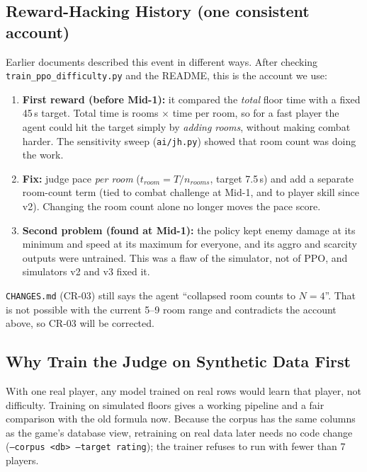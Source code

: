 \subsection{Reward-Hacking History (one consistent account)}
\label{sec:reward_history}
Earlier documents described this event in different ways. After checking \texttt{train\_ppo\_difficulty.py} and the README, this is the account we use:
\begin{enumerate}
    \item \textbf{First reward (before Mid-1):} it compared the \emph{total} floor time with a fixed 45\,s target. Total time is rooms $\times$ time per room, so for a fast player the agent could hit the target simply by \emph{adding rooms}, without making combat harder. The sensitivity sweep (\texttt{ai/jh.py}) showed that room count was doing the work.
    \item \textbf{Fix:} judge pace \emph{per room} ($t_{room} = T / n_{rooms}$, target 7.5\,s) and add a separate room-count term (tied to combat challenge at Mid-1, and to player skill since v2). Changing the room count alone no longer moves the pace score.
    \item \textbf{Second problem (found at Mid-1):} the policy kept enemy damage at its minimum and speed at its maximum for everyone, and its aggro and scarcity outputs were untrained. This was a flaw of the simulator, not of PPO, and simulators v2 and v3 fixed it.
\end{enumerate}
\texttt{CHANGES.md} (CR-03) still says the agent ``collapsed room counts to $N = 4$''. That is not possible with the current 5--9 room range and contradicts the account above, so CR-03 will be corrected. 

\subsection{Why Train the Judge on Synthetic Data First}
With one real player, any model trained on real rows would learn that player, not difficulty. Training on simulated floors gives a working pipeline and a fair comparison with the old formula now. Because the corpus has the same columns as the game's database view, retraining on real data later needs no code change (\texttt{--corpus <db> --target rating}); the trainer refuses to run with fewer than 7 players.

